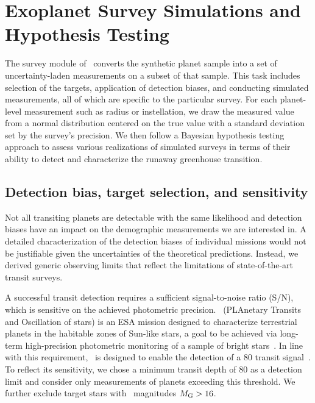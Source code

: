 \documentclass[twocolumn]{aastex631}
\begin{document}
\section{Exoplanet Survey Simulations and Hypothesis Testing}\label{sec:met_surveys-hypotests}
The survey module of \bioverse\ converts the synthetic planet sample into a set of uncertainty-laden measurements on a subset of that sample.
This task includes selection of the targets, application of detection biases, and conducting simulated measurements, all of which are specific to the particular survey.
For each planet-level measurement such as radius or instellation, we draw the measured value from a normal distribution centered on the true value with a standard deviation set by the survey's precision.
We then follow a Bayesian hypothesis testing approach to assess various realizations of simulated surveys in terms of their ability to detect and characterize the runaway greenhouse transition.

\subsection{Detection bias, target selection, and sensitivity}\label{sec:sensitivity} %
Not all transiting planets are detectable with the same likelihood and detection biases have an impact on the demographic measurements we are interested in.
A detailed characterization of the detection biases of individual missions would not be justifiable given the uncertainties of the theoretical predictions.
Instead, we derived generic observing limits that reflect the limitations of state-of-the-art transit surveys.

A successful transit detection requires a sufficient signal-to-noise ratio (S/N), which is sensitive on the achieved photometric precision. %
\plato\ (PLAnetary Transits and Oscillation of stars) is an ESA mission designed to characterize terrestrial planets in the habitable zones of Sun-like stars, a goal to be achieved via long-term high-precision photometric monitoring of a sample of bright stars~\citep{Rauer2016}.
In line with this requirement, \plato\ is designed to enable the detection of a \SI{80}{\ppm} transit signal~\citep[][Matuszewski et al., in prep.]{plato2017}.
To reflect its sensitivity, we chose a minimum transit depth of \SI{80}{\ppm} as a detection limit and consider only measurements of planets exceeding this threshold.
We further exclude target stars with \gaia\ magnitudes $M_\mathrm{G} > 16$.
\end{document}
